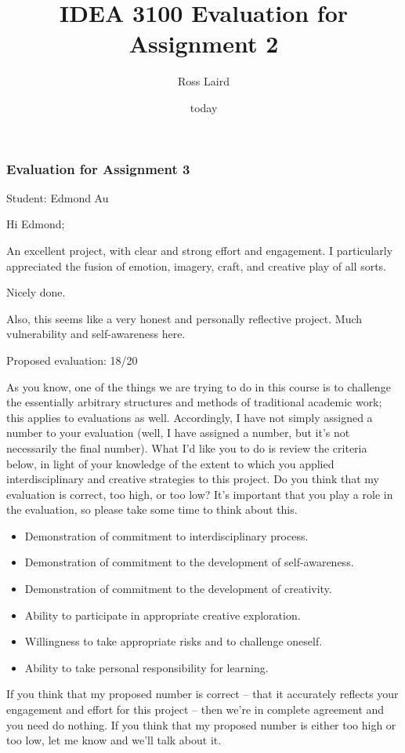 \documentclass[letterpaper,10pt,DIV=9,headsepline]{scrreprt}
\author{Ross Laird}
\title{IDEA 3100 Evaluation for Assignment 2}
\date{today}
\begin{document}
\pagestyle{scrheadings}
\setcounter{secnumdepth}{-1}

\subsubsection{Evaluation for Assignment 3}

Student: Edmond Au

\bigskip
Hi Edmond;

An excellent project, with clear and strong effort and engagement. I
particularly appreciated the fusion of emotion, imagery, craft, and
creative play of all sorts.

Nicely done.

Also, this seems like a very honest and personally reflective project.
Much vulnerability and self-awareness here.



\bigskip
Proposed evaluation: 18/20

\bigskip
As you know, one of the things we are trying to do in this course is
to challenge the essentially arbitrary structures and methods of
traditional academic work; this applies to evaluations as well.
Accordingly, I have not simply assigned a number to your evaluation
(well, I have assigned a number, but it's not necessarily the final
number). What I'd like you to do is review the criteria below, in
light of your knowledge of the extent to which you applied
interdisciplinary and creative strategies to this project. Do you
think that my evaluation is correct, too high, or too low? It's
important that you play a role in the evaluation, so please take some
time to think about this.

\begin{itemize}
\item Demonstration of commitment to interdisciplinary process.
\item Demonstration of commitment to the development of self-awareness.
\item Demonstration of commitment to the development of creativity.
\item Ability to participate in appropriate creative exploration.
\item Willingness to take appropriate risks and to challenge oneself.
\item Ability to take personal responsibility for learning.
\end{itemize}

If you think that my proposed number is correct -- that it accurately
reflects your engagement and effort for this project -- then we're in
complete agreement and you need do nothing. If you think that my
proposed number is either too high or too low, let me know and we'll
talk about it.
\end{document}
